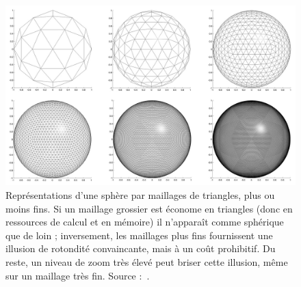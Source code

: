 	\begin{figure}[H]
    	\centering
    	\includegraphics[width=\textwidth]{figures/ch1/spheremeshes}
    	\caption{Représentations d'une sphère par maillages de triangles, plus ou moins fins. Si un maillage grossier est économe en triangles (donc en ressources de calcul et en mémoire) il n'apparaît comme sphérique que de loin ; inversement, les maillages plus fins fournissent une illusion de rotondité convaincante, mais à un coût prohibitif. Du reste, un niveau de zoom très élevé peut briser cette illusion, même sur un maillage très fin. Source :~\cite{seo2010heat}.}
    	\label{fig:spheremeshes}
	\end{figure}
		
